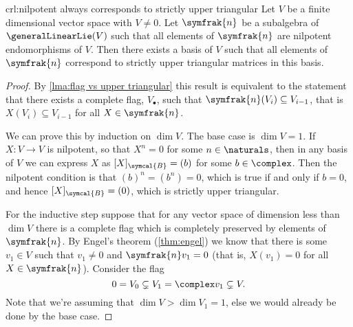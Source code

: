 \documentclass[fleqn]{NotesClass}
\newcommand{\nilpotentLie}{\symfrak{n}}
\newcommand{\basis}{\symcal{B}}
\begin{document}
    \begin{crl}{}{crl:nilpotent always corresponds to strictly upper triangular}
        Let \(V\) be a finite dimensional vector space with \(V \ne 0\).
        Let \(\nilpotentLie\) be a subalgebra of \(\generalLinearLie(V)\) such that all elements of \(\nilpotentLie\) are nilpotent endomorphisms of \(V\).
        Then there exists a basis of \(V\) such that all elements of \(\nilpotentLie\) correspond to strictly upper triangular matrices in this basis.
        \begin{proof}
            By \cref{lma:flag vs upper triangular} this result is equivalent to the statement that there exists a complete flag, \(V_{\bullet}\), such that \(\nilpotentLie(V_i) \subseteq V_{i-1}\), that is \(X(V_i) \subseteq V_{i - 1}\) for all \(X \in \nilpotentLie\).
            
            We can prove this by induction on \(\dim V\).
            The base case is \(\dim V = 1\).
            If \(X \colon V \to V\) is nilpotent, so that \(X^n = 0\) for some \(n \in \naturals\), then in any basis of \(V\) we can express \(X\) as \([X]_{\basis} = (b)\) for some \(b \in \complex\).
            Then the nilpotent condition is that \((b)^n = (b^n) = 0\), which is true if and only if \(b = 0\), and hence \([X]_{\basis} = (0)\), which is strictly upper triangular.
            
            For the inductive step suppose that for any vector space of dimension less than \(\dim V\) there is a complete flag which is completely preserved by elements of \(\nilpotentLie\).
            By Engel's theorem (\cref{thm:engel}) we know that there is some \(v_1 \in V\) such that \(v_1 \ne 0\) and \(\nilpotentLie v_1 = 0\) (that is, \(X(v_1) = 0\) for all \(X \in \nilpotentLie\)).
            Consider the flag
            \begin{equation}
                0 = V_0 \subsetneq V_1 = \complex v_1 \subsetneq V.
            \end{equation}
            Note that we're assuming that \(\dim V > \dim V_1 = 1\), else we would already be done by the base case.
            

\end{proof}
\end{crl}
\end{document}
